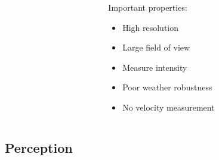 {\begin{frame}
\begin{columns}[T]
\begin{column}{.5\textwidth}
\begin{columns}[T]
\begin{column}{0.4\textwidth}
\begin{itemize}
                \end{itemize}
            \end{column}
            \begin{column}{0.6\textwidth}
                \footnotesize
                Important properties:
                \begin{itemize}
                    \item High resolution
                    \item Large field of view
                    \item Measure intensity
                    \item Poor weather robustness
                    \item No velocity measurement
                \end{itemize}
            \end{column}
        \end{columns}
    \end{column}
\end{columns}
\end{frame}

\subsection{Perception}

}

